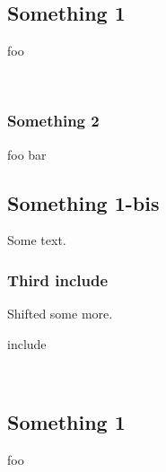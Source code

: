 \subsection{Something 1\label{something-1}}%
foo

\label{package-test+u+package+++ml-module-Include+u+sections-val-foo}\\
\subsubsection{Something 2\label{something-2}}%
\label{package-test+u+package+++ml-module-Include+u+sections-val-bar}\begin{ocamlindent}foo bar\end{ocamlindent}%
\medbreak
\subsection{Something 1-bis\label{something-1-bis}}%
Some text.

\subsubsection{Third include\label{third-include}}%
Shifted some more.

\begin{keyword}include\end{keyword}
 \hyperref[package-test+u+package+++ml-module-Include+u+sections-module-type-Something]{}\label{package-test+u+package+++ml-module-Include+u+sections-val-something}\\
\subsection{Something 1\label{something-1}}%
foo

\label{package-test+u+package+++ml-module-Include+u+sections-val-foo}\\
